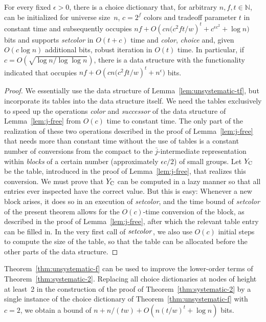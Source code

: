 \documentclass[envcountsame,envcountsect,undated,nolinenumbers]{lnthi}
\def\Tvn#1{\hbox{\textit{#1\/}}}
\def\TbbbN{\mathbb{N}}
\def\jj{{\bar j}}
\begin{document}
\begin{theorem}
\label{thm:unsystematic-f}For every fixed $\epsilon>0$,
there is a choice dictionary that, for
arbitrary $n,f,t\in\TbbbN$,
can be initialized for universe size~$n$,
$c=2^f$ colors and tradeoff parameter $t$
in constant time and subsequently occupies
$n f+O({{c n(c^2 f t}/w})^t+c^{\epsilon c^2}+\log n)$ bits
and supports
\Tvn{setcolor} in $O(t+c)$ time and
\Tvn{color}, \Tvn{choice} and,
given $O(c\log n)$ additional bits,
robust iteration in $O(t)$ time.
In particular, if $c=O(\sqrt{{{\log n}}/{\log\log n}})$,
there is a data structure with the functionality
indicated that occupies
$n f+O({{c n(c^2 f t}/w})^t+n^\epsilon)$ bits.
\end{theorem}

\begin{proof}
We essentially use the data structure of
Lemma~\ref{lem:unsystematic-tf}, but
incorporate its tables 
into the data structure itself.
We need the tables exclusively to speed
up the operations \Tvn{color} and \Tvn{successor}
of the data structure of Lemma~\ref{lem:j-free}
from $O(c)$ time to constant time.
The only part of the realization of these two
operations described in the proof of
Lemma~\ref{lem:j-free} that needs more than
constant time without the use of
tables is a constant number of conversions
from the compact to the $\jj$-intermediate representation
within \emph{blocks}
of a certain number (approximately
${{\epsilon c}/2}$) of small groups.
Let $Y_{\mbox{\scriptsize C}}$ be the table, introduced in the proof of
Lemma~\ref{lem:j-free}, that realizes this conversion. We must prove
that $Y_{\mbox{\scriptsize C}}$ can
be computed in a lazy manner so that all
entries ever inspected have the correct value.
But this is easy:
Whenever a new block arises, it does
so in an execution of \Tvn{setcolor}, and the
time bound of \Tvn{setcolor} of
the present theorem allows for the
$O(c)$-time conversion of the block,
as described in the proof of Lemma~\ref{lem:j-free},
after which the relevant table entry can be filled in.
In the very first call of $\Tvn{setcolor}$,
we also use $O(c)$ initial steps to compute
the size of the table, so that the table can
be allocated before the other parts of the
data structure.
\end{proof}

Theorem~\ref{thm:unsystematic-f} can be
used to improve the lower-order terms of
Theorem~\ref{thm:systematic-2}.
Replacing all choice dictionaries at nodes of
height at least~2 in the construction of the proof of
Theorem~\ref{thm:systematic-2} by a single
instance of the choice dictionary of
Theorem~\ref{thm:unsystematic-f} with $c=2$,
we obtain a bound of
$n+{n/{(t w)}}+O(n({t/w})^t+\log n)$ bits.
\end{document}
